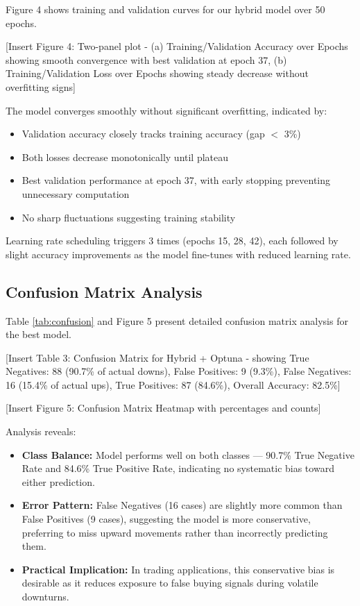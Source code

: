 \documentclass[conference]{IEEEtran}
\begin{document}
Figure 4 shows training and validation curves for our hybrid model over 50 epochs.

[Insert Figure 4: Two-panel plot - (a) Training/Validation Accuracy over Epochs showing smooth convergence with best validation at epoch 37, (b) Training/Validation Loss over Epochs showing steady decrease without overfitting signs]

The model converges smoothly without significant overfitting, indicated by:
\begin{itemize}
\item Validation accuracy closely tracks training accuracy (gap $<$ 3\%)
\item Both losses decrease monotonically until plateau
\item Best validation performance at epoch 37, with early stopping preventing unnecessary computation
\item No sharp fluctuations suggesting training stability
\end{itemize}

Learning rate scheduling triggers 3 times (epochs 15, 28, 42), each followed by slight accuracy improvements as the model fine-tunes with reduced learning rate.

\subsection{Confusion Matrix Analysis}

Table \ref{tab:confusion} and Figure 5 present detailed confusion matrix analysis for the best model.

[Insert Table 3: Confusion Matrix for Hybrid + Optuna - showing True Negatives: 88 (90.7\% of actual downs), False Positives: 9 (9.3\%), False Negatives: 16 (15.4\% of actual ups), True Positives: 87 (84.6\%), Overall Accuracy: 82.5\%]

[Insert Figure 5: Confusion Matrix Heatmap with percentages and counts]

Analysis reveals:

\begin{itemize}
\item \textbf{Class Balance:} Model performs well on both classes — 90.7\% True Negative Rate and 84.6\% True Positive Rate, indicating no systematic bias toward either prediction.

\item \textbf{Error Pattern:} False Negatives (16 cases) are slightly more common than False Positives (9 cases), suggesting the model is more conservative, preferring to miss upward movements rather than incorrectly predicting them.

\item \textbf{Practical Implication:} In trading applications, this conservative bias is desirable as it reduces exposure to false buying signals during volatile downturns.
\end{itemize}
\end{document}
